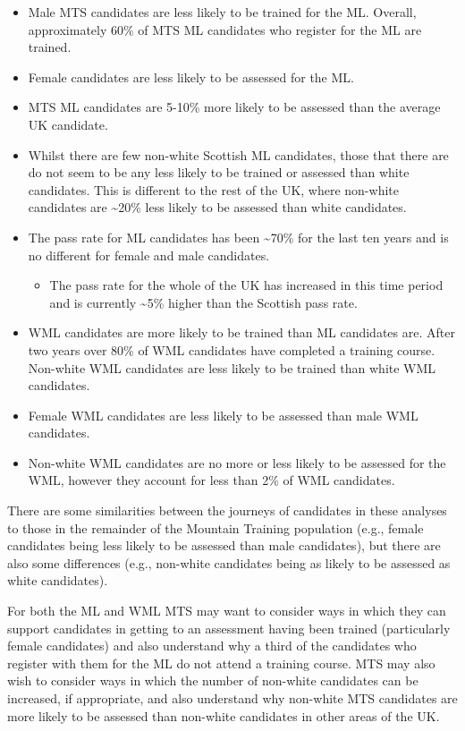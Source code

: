 \documentclass[
  12pt,
  a4paper,
]{book}
\providecommand{\tightlist}{%
  \setlength{\itemsep}{0pt}\setlength{\parskip}{0pt}}
\begin{document}
\begin{itemize}
\tightlist
\item
  Male MTS candidates are less likely to be trained for the ML. Overall, approximately 60\% of MTS ML candidates who register for the ML are trained.
\item
  Female candidates are less likely to be assessed for the ML.
\item
  MTS ML candidates are 5-10\% more likely to be assessed than the average UK candidate.
\item
  Whilst there are few non-white Scottish ML candidates, those that there are do not seem to be any less likely to be trained or assessed than white candidates. This is different to the rest of the UK, where non-white candidates are \textasciitilde20\% less likely to be assessed than white candidates.
\item
  The pass rate for ML candidates has been \textasciitilde70\% for the last ten years and is no different for female and male candidates.

  \begin{itemize}
  \tightlist
  \item
    The pass rate for the whole of the UK has increased in this time period and is currently \textasciitilde5\% higher than the Scottish pass rate.
  \end{itemize}
\item
  WML candidates are more likely to be trained than ML candidates are. After two years over 80\% of WML candidates have completed a training course. Non-white WML candidates are less likely to be trained than white WML candidates.
\item
  Female WML candidates are less likely to be assessed than male WML candidates.
\item
  Non-white WML candidates are no more or less likely to be assessed for the WML, however they account for less than 2\% of WML candidates.
\end{itemize}

There are some similarities between the journeys of candidates in these analyses to those in the remainder of the Mountain Training population (e.g., female candidates being less likely to be assessed than male candidates), but there are also some differences (e.g., non-white candidates being as likely to be assessed as white candidates).

For both the ML and WML MTS may want to consider ways in which they can support candidates in getting to an assessment having been trained (particularly female candidates) and also understand why a third of the candidates who register with them for the ML do not attend a training course. MTS may also wish to consider ways in which the number of non-white candidates can be increased, if appropriate, and also understand why non-white MTS candidates are more likely to be assessed than non-white candidates in other areas of the UK.
\end{document}
